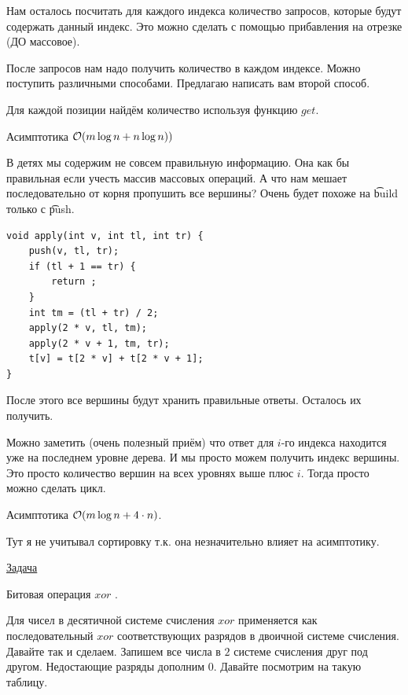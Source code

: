 Нам осталось посчитать для каждого индекса количество запросов, которые будут содержать данный индекс. Это можно сделать с помощью прибавления на отрезке (ДО массовое).

После запросов нам надо получить количество в каждом индексе. Можно поступить различными способами. Предлагаю написать вам второй способ.


\up \up
\begin{MyList}[0pt]
	\item Для каждой позиции найдём количество используя функцию $get$.
	
	Асимптотика $\mathcal{O}(m \log n + n \log n))$
	
	\item  В детях мы содержим не совсем правильную информацию. Она как бы правильная если учесть массив массовых операций. А что нам мешает последовательно от корня пропушить все вершины? Очень будет похоже на \t{build} только с \t{push}.
	
\begin{verbatim}
void apply(int v, int tl, int tr) {
	push(v, tl, tr);
	if (tl + 1 == tr) {
		return ;
	}
	int tm = (tl + tr) / 2;
	apply(2 * v, tl, tm);
	apply(2 * v + 1, tm, tr);
	t[v] = t[2 * v] + t[2 * v + 1];
}
\end{verbatim}

	
	После этого все вершины будут хранить правильные ответы. Осталось их получить.
	
	Можно заметить (очень полезный приём) что ответ для $i$-го индекса находится уже на последнем уровне дерева. И мы просто можем получить индекс вершины. Это просто количество вершин на всех уровнях выше плюс $i$. Тогда просто можно сделать цикл.
	
	Асимптотика $\mathcal{O}(m \log n + 4 \cdot n)$.
\end{MyList}

Тут я не учитывал сортировку т.к. она незначительно влияет на асимптотику.

\pagebreak


\href{https://codeforces.com/problemset/problem/242/E}{Задача}

Битовая операция $xor$ {}. 

Для чисел в десятичной системе счисления $xor$ применяется как последовательный $xor$ соответствующих разрядов в двоичной системе счисления. Давайте так и сделаем. Запишем все числа в $2$ системе счисления друг под другом. Недостающие разряды дополним $0$. Давайте посмотрим на такую таблицу. 

